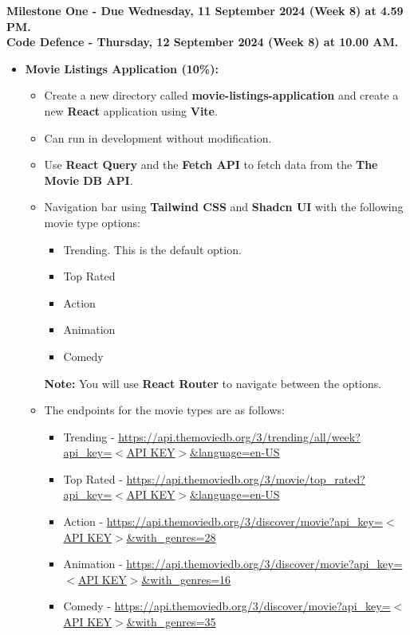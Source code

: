 \documentclass{article}
\begin{document}
\textbf{Milestone One - Due Wednesday, 11 September 2024 (Week 8) at 4.59 PM. \\ Code Defence - Thursday, 12 September 2024 (Week 8) at 10.00 AM.}
\begin{itemize} 
	\item \textbf{Movie Listings Application (10\%):}
	\begin{itemize}
		\item Create a new directory called \textbf{movie-listings-application} and create a new \textbf{React} application using \textbf{Vite}.
		\item Can run in development without modification.
		\item Use \textbf{React Query} and the \textbf{Fetch API} to fetch data from the \textbf{The Movie DB API}.
		\item Navigation bar using \textbf{Tailwind CSS} and \textbf{Shadcn UI} with the following movie type options:
		\begin{itemize}
			\item Trending. This is the default option.
			\item Top Rated
			\item Action
			\item Animation
			\item Comedy
		\end{itemize}
		\textbf{Note:} You will use \textbf{React Router} to navigate between the options.
		\item The endpoints for the movie types are as follows:
	\begin{itemize}
		\item Trending - \href{https://api.themoviedb.org/3/trending/all/week?api\_key=$<$API KEY$>$\&language=en-US}{https://api.themoviedb.org/3/trending/all/week?api\_key=$<$API KEY$>$\&language=en-US}
		\item Top Rated - \href{https://api.themoviedb.org/3/movie/top\_rated?api\_key=$<$API KEY$>$\&language=en-US}{https://api.themoviedb.org/3/movie/top\_rated?api\_key=$<$API KEY$>$\&language=en-US}
		\item Action - \href{https://api.themoviedb.org/3/discover/movie?api\_key=$<$API KEY$>$\&with\_genres=28}{https://api.themoviedb.org/3/discover/movie?api\_key=$<$API KEY$>$\&with\_genres=28}
		\item Animation - \href{https://api.themoviedb.org/3/discover/movie?api\_key=$<$API KEY$>$\&with\_genres=16}{https://api.themoviedb.org/3/discover/movie?api\_key=$<$API KEY$>$\&with\_genres=16}
		\item Comedy - \href{https://api.themoviedb.org/3/discover/movie?api\_key=$<$API KEY$>$\&with\_genres=35}{https://api.themoviedb.org/3/discover/movie?api\_key=$<$API KEY$>$\&with\_genres=35}

\end{itemize}
\end{itemize}
\end{itemize}
\end{document}

